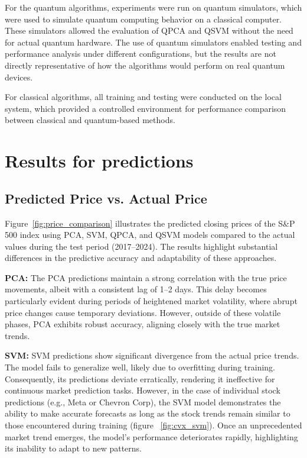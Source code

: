\documentclass[journal]{IEEEtran}
\begin{document}
For the quantum algorithms, experiments were run on quantum simulators, which were used to simulate quantum computing behavior on a classical computer. These simulators allowed the evaluation of QPCA and QSVM without the need for actual quantum hardware. The use of quantum simulators enabled testing and performance analysis under different configurations, but the results are not directly representative of how the algorithms would perform on real quantum devices.

For classical algorithms, all training and testing were conducted on the local system, which provided a controlled environment for performance comparison between classical and quantum-based methods.

\section{Results for predictions}

\subsection{Predicted Price vs. Actual Price}

Figure~\ref{fig:price_comparison} illustrates the predicted closing prices of the S\&P 500 index using PCA, SVM, QPCA, and QSVM models compared to the actual values during the test period (2017--2024). The results highlight substantial differences in the predictive accuracy and adaptability of these approaches.

\textbf{PCA:} The PCA predictions maintain a strong correlation with the true price movements, albeit with a consistent lag of 1--2 days. This delay becomes particularly evident during periods of heightened market volatility, where abrupt price changes cause temporary deviations. However, outside of these volatile phases, PCA exhibits robust accuracy, aligning closely with the true market trends.

\textbf{SVM:} SVM predictions show significant divergence from the actual price trends. The model fails to generalize well, likely due to overfitting during training. Consequently, its predictions deviate erratically, rendering it ineffective for continuous market prediction tasks. However, in the case of individual stock predictions (e.g., Meta or Chevron Corp), the SVM model demonstrates the ability to make accurate forecasts as long as the stock trends remain similar to those encountered during training (figure ~\ref{fig:cvx_svm}). Once an unprecedented market trend emerges, the model's performance deteriorates rapidly, highlighting its inability to adapt to new patterns.
\end{document}
